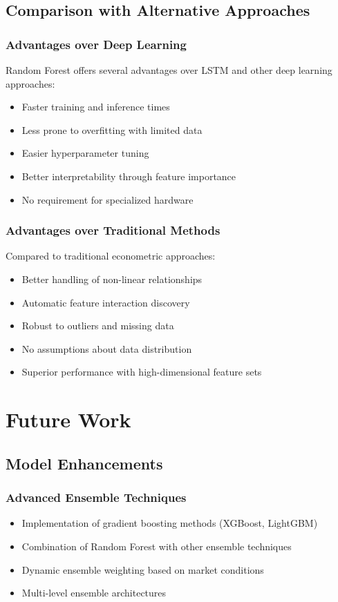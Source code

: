\documentclass[11pt,a4paper]{article}
\begin{document}
\subsection{Comparison with Alternative Approaches}

\subsubsection{Advantages over Deep Learning}

Random Forest offers several advantages over LSTM and other deep learning approaches:
\begin{itemize}
    \item Faster training and inference times
    \item Less prone to overfitting with limited data
    \item Easier hyperparameter tuning
    \item Better interpretability through feature importance
    \item No requirement for specialized hardware
\end{itemize}

\subsubsection{Advantages over Traditional Methods}

Compared to traditional econometric approaches:
\begin{itemize}
    \item Better handling of non-linear relationships
    \item Automatic feature interaction discovery
    \item Robust to outliers and missing data
    \item No assumptions about data distribution
    \item Superior performance with high-dimensional feature sets
\end{itemize}

\section{Future Work}

\subsection{Model Enhancements}

\subsubsection{Advanced Ensemble Techniques}
\begin{itemize}
    \item Implementation of gradient boosting methods (XGBoost, LightGBM)
    \item Combination of Random Forest with other ensemble techniques
    \item Dynamic ensemble weighting based on market conditions
    \item Multi-level ensemble architectures
\end{itemize}
\end{document}
